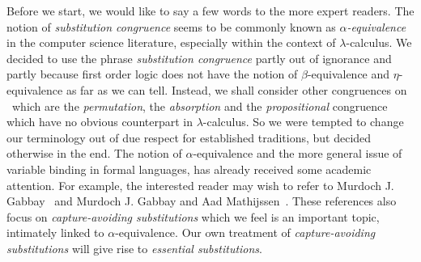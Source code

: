 Before we start, we would like to say a few words to the more expert
readers. The notion of {\em substitution congruence} seems to be
commonly known as {\em $\alpha$-equivalence} in the computer science
literature, especially within the context of $\lambda$-calculus. We
decided to use the phrase {\em substitution congruence} partly out
of ignorance and partly because first order logic does not have the
notion of $\beta$-equivalence and $\eta$-equivalence as far as we
can  tell. Instead, we shall consider other congruences on \pv\
which are the {\em permutation}, the {\em absorption} and the {\em
propositional} congruence which have no obvious counterpart in
$\lambda$-calculus. So we were tempted to change our terminology out
of due respect for established traditions, but decided otherwise in
the end. The notion of $\alpha$-equivalence and the more general
issue of variable binding in formal languages, has already received
some academic attention. For example, the interested reader may wish
to refer to Murdoch J. Gabbay~\cite{GabbaySub} and Murdoch J. Gabbay
and Aad Mathijssen~\cite{GabbayCapture}. These references also focus
on {\em capture-avoiding substitutions} which we feel is an
important topic, intimately linked to $\alpha$-equivalence. Our own
treatment of {\em capture-avoiding substitutions} will give rise to
{\em essential substitutions}.
